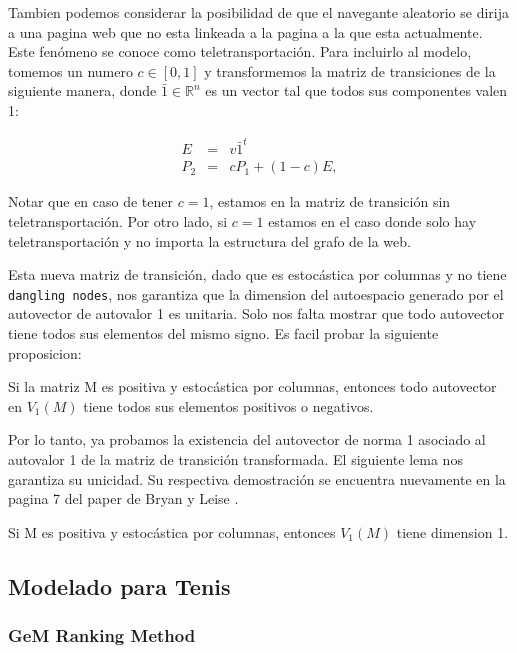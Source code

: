 Tambien podemos considerar la posibilidad de que el navegante aleatorio se dirija a una pagina web que no esta linkeada a la pagina a la que esta actualmente. Este fenómeno se conoce como teletransportación. Para incluirlo al modelo, tomemos un numero $c \in [0,1]$ y transformemos la matriz de transiciones de la siguiente manera, donde $\bar{1} \in \mathbb{R}^n$ es un vector tal que todos sus componentes valen 1:

\begin{eqnarray*}
E & = & v \bar{1}^t \\
P_2 & = & cP_1 + (1-c)E,
\end{eqnarray*}

Notar que en caso de tener $c=1$, estamos en la matriz de transición sin teletransportación. Por otro lado, si $c=1$ estamos en el caso donde solo hay teletransportación y no importa la estructura del grafo de la web.

Esta nueva matriz de transición, dado que es estocástica por columnas y no tiene \texttt{dangling nodes}, nos garantiza que la dimension del autoespacio generado por el autovector de autovalor 1 es unitaria. Solo nos falta mostrar que todo autovector tiene todos sus elementos del mismo signo. Es facil probar la siguiente proposicion:

\begin{proposition}
Si la matriz M es positiva y estocástica por columnas, entonces todo autovector en $V_1(M)$ tiene todos sus elementos positivos o negativos.
\end{proposition}

Por lo tanto, ya probamos la existencia del autovector de norma 1 asociado al autovalor 1 de la matriz de transición transformada. El siguiente lema nos garantiza su unicidad. Su respectiva demostración se encuentra nuevamente en la pagina 7 del paper de Bryan y Leise \cite{Bryan2006}.

\begin{lemma}
\item Si M es positiva y estocástica por columnas, entonces $V_1(M)$ tiene dimension 1.
\end{lemma}

\subsection{Modelado para Tenis}

\subsubsection{GeM Ranking Method}

